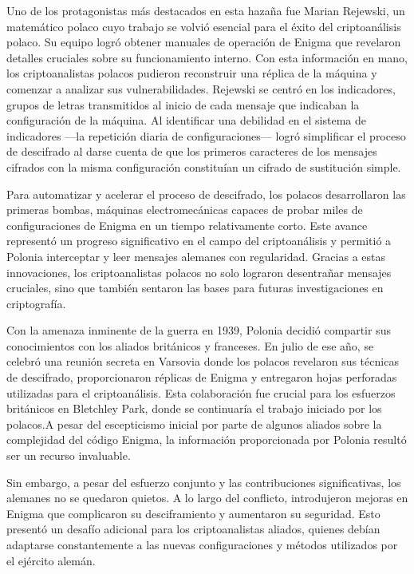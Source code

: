 \documentclass{article}
\begin{document}
Uno de los protagonistas más destacados en esta hazaña fue 
Marian Rejewski, un matemático polaco cuyo trabajo se volvió 
esencial para el éxito del criptoanálisis polaco. Su equipo 
logró obtener manuales de operación de Enigma que revelaron 
detalles cruciales sobre su funcionamiento interno. Con esta 
información en mano, los criptoanalistas polacos pudieron 
reconstruir una réplica de la máquina y comenzar a analizar 
sus vulnerabilidades. Rejewski se centró en los indicadores, 
grupos de letras transmitidos al inicio de cada mensaje que 
indicaban la configuración de la máquina. Al identificar una 
debilidad en el sistema de indicadores —la repetición diaria 
de configuraciones— logró simplificar el proceso de descifrado 
al darse cuenta de que los primeros caracteres de los 
mensajes cifrados con la misma configuración constituían 
un cifrado de sustitución simple.\cite{EnigmaC}\cite{AlanTuringEnigmaO}


Para automatizar y acelerar el proceso de descifrado, los 
polacos desarrollaron las primeras bombas, máquinas 
electromecánicas capaces de probar miles de configuraciones 
de Enigma en un tiempo relativamente corto. Este avance 
representó un progreso significativo en el campo del 
criptoanálisis y permitió a Polonia interceptar y leer 
mensajes alemanes con regularidad. Gracias a estas 
innovaciones, los criptoanalistas polacos no solo lograron 
desentrañar mensajes cruciales, sino que también sentaron 
las bases para futuras investigaciones en criptografía.

Con la amenaza inminente de la guerra en 1939, Polonia 
decidió compartir sus conocimientos con los aliados 
británicos y franceses. En julio de ese año, se celebró 
una reunión secreta en Varsovia donde los polacos revelaron 
sus técnicas de descifrado, proporcionaron réplicas de Enigma 
y entregaron hojas perforadas utilizadas para el 
criptoanálisis. Esta colaboración fue crucial para 
los esfuerzos británicos en Bletchley Park, donde 
se continuaría el trabajo iniciado por los polacos.A 
pesar del escepticismo inicial por parte de algunos 
aliados sobre la complejidad del código Enigma, la 
información proporcionada por Polonia resultó ser un 
recurso invaluable.\cite{EnigmaC}\cite{AlanTuringEnigmaO}

Sin embargo, a pesar del esfuerzo conjunto y las 
contribuciones significativas, los alemanes no se 
quedaron quietos. A lo largo del conflicto, introdujeron 
mejoras en Enigma que complicaron su desciframiento y 
aumentaron su seguridad. Esto presentó un desafío 
adicional para los criptoanalistas aliados, quienes 
debían adaptarse constantemente a las nuevas 
configuraciones y métodos utilizados por el ejército alemán.
\end{document}
